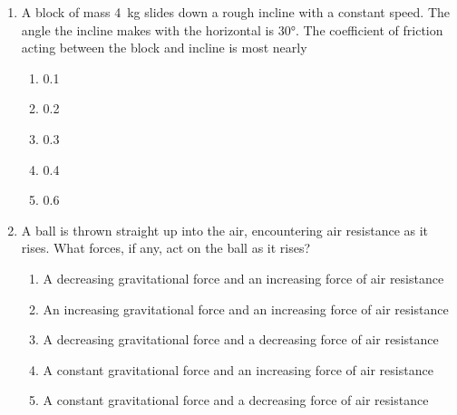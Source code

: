\documentclass{../../../oss-apphys}
\begin{document}
\begin{multicols}{2}
\begin{enumerate}[resume,leftmargin=18pt]
    
  \item A block of mass \SI{4}{\kilo\gram} slides down a rough incline with a
    constant speed. The angle the incline makes with the horizontal is
    \ang{30}. The coefficient of friction acting between the block and incline
    is most nearly
    
    \begin{enumerate}[nosep,leftmargin=18pt,label=(\Alph*)]
    \item 0.1
    \item 0.2
    \item 0.3
    \item 0.4
    \item 0.6
    \end{enumerate}
    \columnbreak
    
  \item A ball is thrown straight up into the air, encountering air resistance
    as it rises. What forces, if any, act on the ball as it rises?
    \begin{enumerate}[nosep,leftmargin=18pt,label=(\Alph*)]
    \item A decreasing gravitational force and an increasing force of air
      resistance
    \item An increasing gravitational force and an increasing force of air
      resistance
    \item A decreasing gravitational force and a decreasing force of air
      resistance
    \item A constant gravitational force and an increasing force of air
      resistance
    \item A constant gravitational force and a decreasing force of air
      resistance
    \end{enumerate}


\end{enumerate}
\end{multicols}
\end{document}
